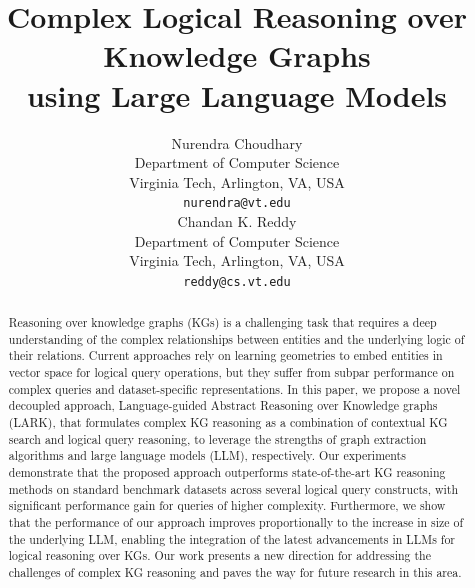 \documentclass{article} %
\title{Complex Logical Reasoning over Knowledge Graphs \\using Large Language Models}
\author{Nurendra Choudhary \\
Department of Computer Science\\
Virginia Tech, Arlington, VA, USA \\
\texttt{nurendra@vt.edu} \\
\And
Chandan K. Reddy \\
Department of Computer Science\\
Virginia Tech, Arlington, VA, USA \\
\texttt{reddy@cs.vt.edu} \\
}
\newcommand{\model}{LARK}
\newcommand{\fullmodel}{Language-guided Abstract Reasoning over Knowledge graphs}
\begin{document}
\maketitle

\begin{abstract}
Reasoning over knowledge graphs (KGs) is a challenging task that requires a deep understanding of the complex relationships between entities and the underlying logic of their relations. Current approaches rely on learning geometries to embed entities in vector space for logical query operations, but they suffer from subpar performance on complex queries and dataset-specific representations. In this paper, we propose a novel decoupled approach, {\fullmodel} ({\model}), that formulates complex KG reasoning as a combination of contextual KG search and %
logical query reasoning, to leverage the strengths of graph extraction algorithms and large language models (LLM), respectively. Our experiments demonstrate that the proposed approach outperforms state-of-the-art KG reasoning methods on standard benchmark datasets across several logical query constructs, with significant performance gain for queries of higher complexity. Furthermore, we show that the performance of our approach improves proportionally to the increase in size of the underlying LLM, enabling the integration of the latest advancements in LLMs for logical reasoning over KGs. Our work presents a new direction for addressing the challenges of complex KG reasoning and paves the way for future research in this area.
\end{abstract}
\end{document}
